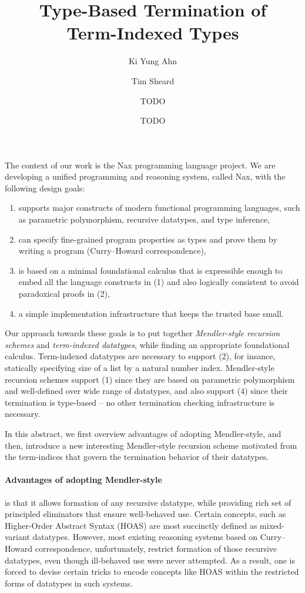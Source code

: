 \documentclass[a4paper]{easychair} %
\title{Type-Based Termination of\\ Term-Indexed Types}
\author{
Ki Yung Ahn\inst{1}
\and
Tim Sheard\inst{1}
 \and
TODO\inst{2}
 \and
TODO\inst{2}
}
\institute{
  Portland State University,\thanks{Funded by XXX project.} \\
  Portland, OR, USA
\and
  University of Cambridge, \\
  Cambridge, UK
}
\begin{document}
\maketitle


The context of our work is the Nax programming language project.
We are developing a unified programming and reasoning system,
called Nax, with the following design goals:\vspace*{-1ex}
\begin{enumerate}[(1)]
 \item supports major constructs of modern functional programming languages,
 such as parametric polymorphism, recursive datatypes, and type inference,
 \vspace*{-1.2ex}
 \item can specify fine-grained program properties as types and
 prove them by writing a program (Curry--Howard correspondence),
 \vspace*{-1.2ex}
 \item is based on a minimal foundational calculus
 that is expressible enough to embed all the language constructs in (1)
 and also logically consistent to avoid paradoxical proofs in (2),
 \vspace*{-1.2ex}
 \item a simple implementation infrastructure that keeps the trusted base small.
\end{enumerate}
Our approach towards these goals is to put together
\emph{Mendler-style recursion schemes}
and \emph{term-indexed datatypes},
while finding an appropriate foundational calculus.
Term-indexed datatypes are necessary to support (2), for insance,
statically specifying size of a list by a natural number index.
Mendler-style recursion schemes support (1) since they are based
on parametric polymorphism and well-defined over wide range of datatypes,
and also support (4) since their termination is type-based --
no other termination checking infrastructure is necessary.

In this abstract, we first overview advantages of adopting Mendler-style,
and then, introduce a new interesting Mendler-style recursion scheme
motivated from the term-indices that govern the termination
behavior of their datatypes.
\vspace*{-.5ex}
\paragraph{Advantages of adopting Mendler-style\!\!\!}
is that it allows formation of
any recursive datatype, while providing rich set of
principled eliminators that ensure well-behaved use.
Certain concepts, such as Higher-Order Abstract Syntax
(HOAS) are most succinctly defined as mixed-variant datatypes.
However, most existing reasoning systems based on
Curry--Howard correspondence, unfortunately, restrict
formation of those recursive datatypes, even though ill-behaved
use were never attempted. As a result, one is forced to devise
certain tricks to encode concepts like HOAS within the restricted
forms of datatypes in such systems.
\end{document}
